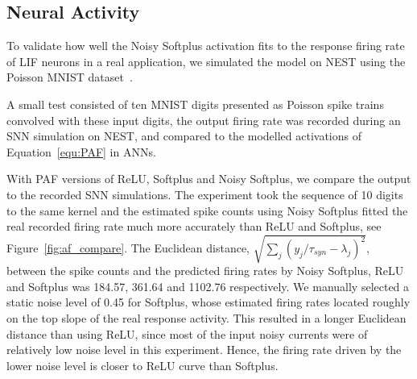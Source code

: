 \documentclass{article}
\begin{document}
\subsection{Neural Activity}
To validate how well the Noisy Softplus activation fits to the response firing rate of LIF neurons in a real application, we simulated the model on NEST using the Poisson MNIST dataset~\cite{liu2016bench}.%

A small test consisted of ten MNIST digits presented as Poisson spike trains  convolved with these input digits, the output firing rate was recorded during an SNN simulation on NEST, and compared to the modelled activations of Equation~\ref{equ:PAF} in ANNs.

With PAF versions of ReLU, Softplus and Noisy Softplus, we compare the output to the recorded SNN simulations.
The experiment took the sequence of 10 digits to the same kernel and the estimated spike counts using Noisy Softplus fitted the real recorded firing rate much more accurately than ReLU and Softplus, see Figure~\ref{fig:af_compare}.
The Euclidean distance, $\sqrt{\sum_{j}(y_j/\tau_{syn} - \lambda_j)^2}$, between the spike counts and the predicted firing rates by Noisy Softplus, ReLU and Softplus was 184.57, 361.64 and 1102.76 respectively.
We manually selected a static noise level of 0.45 for Softplus, whose estimated firing rates located roughly on the top slope of the real response activity.
This resulted in a longer Euclidean distance than using ReLU, since most of the input noisy currents were of relatively low noise level in this experiment.
Hence, the firing rate driven by the lower noise level is closer to ReLU curve than Softplus.
\end{document}
